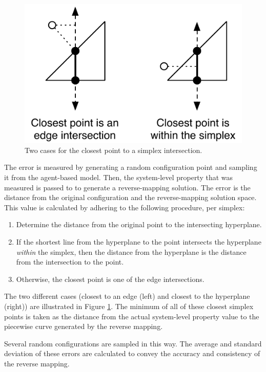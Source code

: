 \begin{figure}[ht]
\centering
\includegraphics[scale=1]{images/closest.pdf}
\caption{Two cases for the closest point to a simplex intersection.}
\label{fig:closest}
\end{figure}

The error is measured by generating a random configuration point and sampling it from the agent-based model.
Then, the system-level property that was measured is passed to \fw to generate a reverse-mapping solution.
The error is the distance from the original configuration and the reverse-mapping solution space.
This value is calculated by adhering to the following procedure, per simplex:
\begin{enumerate}
  \item Determine the distance from the original point to the intersecting hyperplane.
  \item If the shortest line from the hyperplane to the point intersects the hyperplane \textit{within} the simplex, then the distance from the hyperplane is the distance from the intersection to the point.
  \item Otherwise, the closest point is one of the edge intersections.
\end{enumerate}
The two different cases (closest to an edge (left) and closest to the hyperplane (right)) are illustrated in Figure \ref{fig:closest}.
The minimum of all of these closest simplex points is taken as the distance from the actual system-level property value to the piecewise curve generated by the reverse mapping.


Several random configurations are sampled in this way.
The average and standard deviation of these errors are calculated to convey the accuracy and consistency of the reverse mapping.

